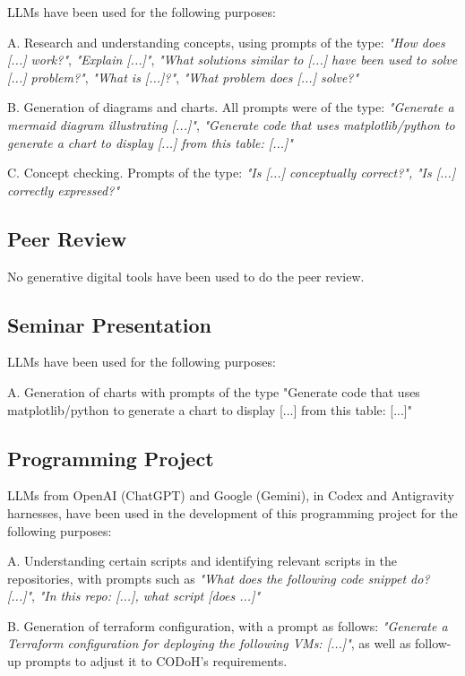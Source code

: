 \documentclass[a4paper]{article}
\begin{document}
LLMs have been used for the following purposes:

A. Research and understanding concepts, using prompts of the type: \textit{"How does [...] work?"}, \textit{"Explain [...]"}, \textit{"What solutions similar to [...] have been used to solve [...] problem?"}, \textit{"What is [...]?"}, \textit{"What problem does [...] solve?"}

B. Generation of diagrams and charts. All prompts were of the type: \textit{"Generate a mermaid diagram illustrating [...]"}, \textit{"Generate code that uses matplotlib/python to generate a chart to display [...] from this table: [...]"}

C. Concept checking. Prompts of the type: \textit{"Is [...] conceptually correct?",} \textit{"Is [...] correctly expressed?"}

\subsection{Peer Review}

No generative digital tools have been used to do the peer review.

\subsection{Seminar Presentation}

LLMs have been used for the following purposes:

A. Generation of charts with prompts of the type "Generate code that uses matplotlib/python to generate a chart to display [...] from this table: [...]"

\subsection{Programming Project}

LLMs from OpenAI (ChatGPT) and Google (Gemini), in Codex and Antigravity harnesses, have been used in the development of this programming project for the following purposes:

A. Understanding certain scripts and identifying relevant scripts in the repositories, with prompts such as \textit{"What does the following code snippet do? [...]"}, \textit{"In this repo: [...], what script [does ...]"}

B. Generation of terraform configuration, with a prompt as follows: \textit{"Generate a Terraform configuration for deploying the following VMs: [...]"}, as well as follow-up prompts to adjust it to CODoH's requirements.
\end{document}
